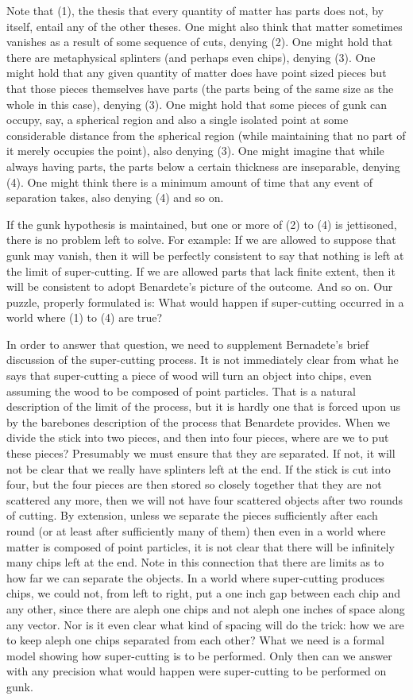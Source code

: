 \documentclass[
  11pt,
  letterpaper,
  DIV=11,
  numbers=noendperiod,
  twoside]{scrartcl}
\begin{document}
Note that (1), the thesis that every quantity of matter has parts does
not, by itself, entail any of the other theses. One might also think
that matter sometimes vanishes as a result of some sequence of cuts,
denying (2). One might hold that there are metaphysical splinters (and
perhaps even chips), denying (3). One might hold that any given quantity
of matter does have point sized pieces but that those pieces themselves
have parts (the parts being of the same size as the whole in this case),
denying (3). One might hold that some pieces of gunk can occupy, say, a
spherical region and also a single isolated point at some considerable
distance from the spherical region (while maintaining that no part of it
merely occupies the point), also denying (3). One might imagine that
while always having parts, the parts below a certain thickness are
inseparable, denying (4). One might think there is a minimum amount of
time that any event of separation takes, also denying (4) and so on.

If the gunk hypothesis is maintained, but one or more of (2) to (4) is
jettisoned, there is no problem left to solve. For example: If we are
allowed to suppose that gunk may vanish, then it will be perfectly
consistent to say that nothing is left at the limit of super-cutting. If
we are allowed parts that lack finite extent, then it will be consistent
to adopt Benardete's picture of the outcome. And so on. Our puzzle,
properly formulated is: What would happen if super-cutting occurred in a
world where (1) to (4) are true?

In order to answer that question, we need to supplement Bernadete's
brief discussion of the super-cutting process. It is not immediately
clear from what he says that super-cutting a piece of wood will turn an
object into chips, even assuming the wood to be composed of point
particles. That is a natural description of the limit of the process,
but it is hardly one that is forced upon us by the barebones description
of the process that Benardete provides. When we divide the stick into
two pieces, and then into four pieces, where are we to put these pieces?
Presumably we must ensure that they are separated. If not, it will not
be clear that we really have splinters left at the end. If the stick is
cut into four, but the four pieces are then stored so closely together
that they are not scattered any more, then we will not have four
scattered objects after two rounds of cutting. By extension, unless we
separate the pieces sufficiently after each round (or at least after
sufficiently many of them) then even in a world where matter is composed
of point particles, it is not clear that there will be infinitely many
chips left at the end. Note in this connection that there are limits as
to how far we can separate the objects. In a world where super-cutting
produces chips, we could not, from left to right, put a one inch gap
between each chip and any other, since there are aleph one chips and not
aleph one inches of space along any vector. Nor is it even clear what
kind of spacing will do the trick: how we are to keep aleph one chips
separated from each other? What we need is a formal model showing how
super-cutting is to be performed. Only then can we answer with any
precision what would happen were super-cutting to be performed on gunk.
\end{document}
